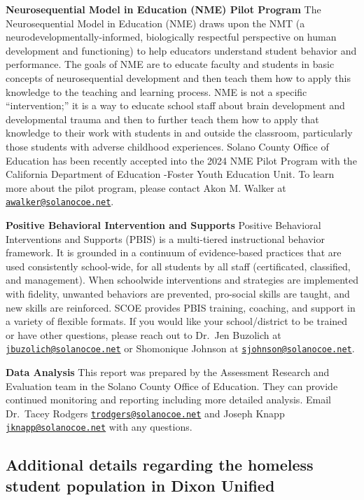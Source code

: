 \documentclass[
  10pt,
  letterpaper,
  DIV=11,
  numbers=noendperiod]{scrartcl}
\begin{document}
\textbf{Neurosequential Model in Education (NME) Pilot Program} The
Neurosequential Model in Education (NME) draws upon the NMT (a
neurodevelopmentally-informed, biologically respectful perspective on
human development and functioning) to help educators understand student
behavior and performance. The goals of NME are to educate faculty and
students in basic concepts of neurosequential development and then teach
them how to apply this knowledge to the teaching and learning process.
NME is not a specific ``intervention;'' it is a way to educate school
staff about brain development and developmental trauma and then to
further teach them how to apply that knowledge to their work with
students in and outside the classroom, particularly those students with
adverse childhood experiences. Solano County Office of Education has
been recently accepted into the 2024 NME Pilot Program with the
California Department of Education -Foster Youth Education Unit. To
learn more about the pilot program, please contact Akon M. Walker at
\href{mailto:awalker@solanocoe.net}{\nolinkurl{awalker@solanocoe.net}}.

\textbf{Positive Behavioral Intervention and Supports} Positive
Behavioral Interventions and Supports (PBIS) is a multi-tiered
instructional behavior framework. It is grounded in a continuum of
evidence-based practices that are used consistently school-wide, for all
students by all staff (certificated, classified, and management). When
schoolwide interventions and strategies are implemented with fidelity,
unwanted behaviors are prevented, pro-social skills are taught, and new
skills are reinforced. SCOE provides PBIS training, coaching, and
support in a variety of flexible formats. If you would like your
school/district to be trained or have other questions, please reach out
to Dr.~Jen Buzolich at
\href{mailto:jbuzolich@solanocoe.net}{\nolinkurl{jbuzolich@solanocoe.net}}
or Shomonique Johnson at
\href{mailto:sjohnson@solanocoe.net}{\nolinkurl{sjohnson@solanocoe.net}}.

\textbf{Data Analysis} This report was prepared by the Assessment
Research and Evaluation team in the Solano County Office of Education.
They can provide continued monitoring and reporting including more
detailed analysis. Email Dr.~Tacey Rodgers
\href{mailto:trodgers@solanocoe.net}{\nolinkurl{trodgers@solanocoe.net}}
and Joseph Knapp
\href{mailto:jknapp@solanocoe.net}{\nolinkurl{jknapp@solanocoe.net}}
with any questions.

\subsection{Additional details regarding the homeless student population
in Dixon
Unified}\label{additional-details-regarding-the-homeless-student-population-in-dixon-unified}
\end{document}
